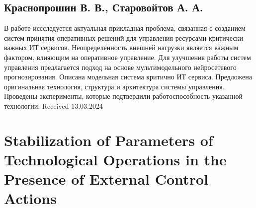 \documentclass[a4paper,8pt]{article}
\begin{document}
\begin{multicols}{2}
\subsection*{\centering Краснопрошин В. В., Старовойтов А. А.}

В работе иссследуется актуальная прикладная проблема, связанная с созданием систем принятия оперативных решений для управления ресурсами критически важных ИТ сервисов. Неопределенность внешней нагрузки является важным фактором, влияющим на оперативное управление. Для улучшения работы систем управления предлагается подход на основе мультимодельного нейросетевого прогнозирования. Описана модельная система критично ИТ сервиса. Предложена оригинальная технология, структура и архитектура системы управления. Проведены эксперименты, которые подтвердили работоспособность указанной технологии. Received 13.03.2024

\end{multicols}

\section*{\centering Stabilization of Parameters of Technological
Operations in the Presence of External Control
Actions}
\end{document}
